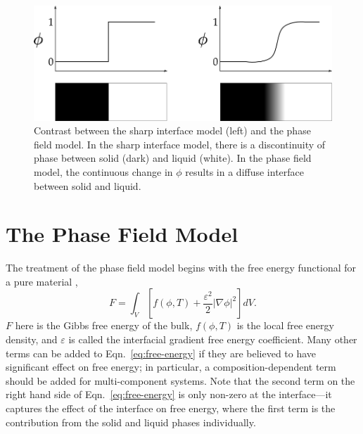\documentclass[12pt]{article}
\renewcommand\l{\mathopen{}\left}
\renewcommand\r{\right}
\newcommand\abs[1]{\l\vert #1 \r\vert}
\newcommand\grad[1]{\nabla #1}
\let\epsilon\varepsilon
\begin{document}
\begin{figure}[htbp]
  \centering
  \begin{minipage}[t]{.8\linewidth}
    \centering
    \includegraphics[width=\linewidth]{img/diffuse_interface}
    \caption{Contrast between the sharp interface model (left) and the
    phase field model. In the sharp interface model, there is a
    discontinuity of phase between solid (dark) and liquid (white). In
    the phase field model, the continuous change in $\phi$ results in
    a diffuse interface between solid and liquid.}
    \label{fig:diffuse-interface}
  \end{minipage}
\end{figure}


\section{The Phase Field Model}
The treatment of the phase field model begins with the free energy
functional for a pure material \cite{Chen2002,Boettinger2002},
\begin{equation}
  \label{eq:free-energy}
  F = \int_V \l[
    f(\phi, T)
    +
    \frac{\epsilon^2}{2} \abs{\grad\phi}^2
  \r]
  dV.
\end{equation}
$F$ here is the Gibbs free energy of the bulk, $f(\phi, T)$ is the
local free energy density, and $\epsilon$ is called the interfacial
gradient free energy coefficient. Many other terms can be added to
Eqn.~\eqref{eq:free-energy} if they are believed to have significant
 effect on free energy; in particular, a composition-dependent term
should be added for multi-component systems. Note that the second term
on the right hand side of Eqn.~\eqref{eq:free-energy} is only non-zero
at the interface---it captures the effect of the interface on free
energy, where the first term is the contribution from the solid and
liquid phases individually.
\end{document}
